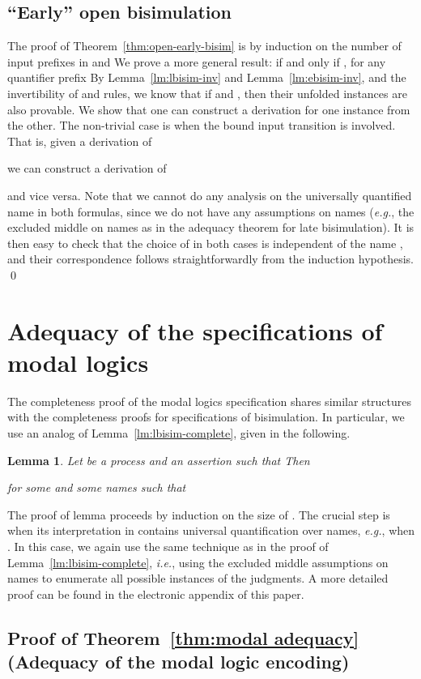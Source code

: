 \documentclass{acmtrans2m}
\newtheorem{lemma}[theorem]{Lemma}
\newcommand{\ie}{{\em i.e.}}
\newcommand{\eg}{{\em e.g.}}
\begin{document}
\subsection{ ``Early'' open bisimulation}

The proof of Theorem~\ref{thm:open-early-bisim} is by induction on the
number of input prefixes in  and  
We prove a more general result: 
if and only if , for any 
quantifier prefix 
By Lemma~\ref{lm:lbisim-inv} and Lemma~\ref{lm:ebisim-inv}, and the invertibility of  and 
rules, we know that if 
and , then their unfolded instances
are also provable. We show that one can construct a derivation for one instance
from the other. The non-trivial case is when the bound input transition is 
involved. That is, given a derivation of

we can construct a derivation of

and vice versa. Note that we cannot do any analysis on the universally quantified
name  in both formulas, since we do not have any assumptions on names
(\eg, the excluded middle on names as in the adequacy theorem for late bisimulation).
It is then easy to check that the choice of  in both cases is independent of
the name , and their correspondence follows straightforwardly from the induction
hypothesis.
\qed

\section{Adequacy of the specifications of modal logics}


The completeness proof of the modal logics specification shares similar structures
with the completeness proofs for specifications of bisimulation. 
In particular, we use an analog of Lemma~\ref{lm:lbisim-complete}, given in the following. 
\begin{lemma}
\label{lm:modal-complete}
Let  be a process and  an assertion such that 
Then 

for some  and some names 
such that 
\end{lemma}
The proof of lemma proceeds by induction on the size of . The crucial
step is when its interpretation in  contains universal quantification
over names, \eg, when . In this case, we again
use the same technique as in the proof of Lemma~\ref{lm:lbisim-complete}, \ie,
using the excluded middle assumptions on names to enumerate all possible
instances of the judgments. A more detailed proof can be found in the electronic
appendix of this paper.


\subsection{Proof of Theorem~\ref{thm:modal adequacy} (Adequacy of the
modal logic encoding)}
\end{document}
